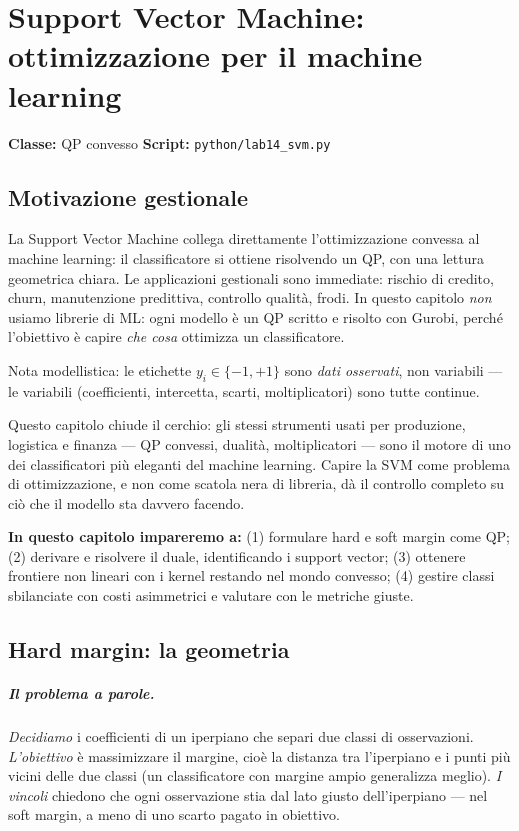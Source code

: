\chapter[Support Vector Machine]{Support Vector Machine: ottimizzazione per il machine learning}
\label{cap:svm}

\noindent\textbf{Classe:} QP convesso \hfill
\textbf{Script:} \texttt{python/lab14\_svm.py}

\section{Motivazione gestionale}

La Support Vector Machine collega direttamente l'ottimizzazione convessa al machine
learning: il classificatore si ottiene risolvendo un QP, con una lettura geometrica
chiara. Le applicazioni gestionali sono immediate: rischio di credito, churn,
manutenzione predittiva, controllo qualità, frodi. In questo capitolo \emph{non}
usiamo librerie di ML: ogni modello è un QP scritto e risolto con Gurobi, perché
l'obiettivo è capire \emph{che cosa} ottimizza un classificatore.

Nota modellistica: le etichette $y_i \in \{-1, +1\}$ sono \emph{dati osservati}, non
variabili --- le variabili (coefficienti, intercetta, scarti, moltiplicatori) sono
tutte continue.



Questo capitolo chiude il cerchio: gli stessi strumenti usati per produzione,
logistica e finanza --- QP convessi, dualità, moltiplicatori --- sono il motore di
uno dei classificatori più eleganti del machine learning. Capire la SVM come
problema di ottimizzazione, e non come scatola nera di libreria, dà il controllo
completo su ciò che il modello sta davvero facendo.

\textbf{In questo capitolo impareremo a:} (1) formulare hard e soft margin come QP;
(2) derivare e risolvere il duale, identificando i support vector; (3) ottenere
frontiere non lineari con i kernel restando nel mondo convesso; (4) gestire classi
sbilanciate con costi asimmetrici e valutare con le metriche giuste.

\section{Hard margin: la geometria}

\paragraph{Il problema a parole.} \emph{Decidiamo} i coefficienti di un iperpiano che
separi due classi di osservazioni. \emph{L'obiettivo} è massimizzare il margine, cioè
la distanza tra l'iperpiano e i punti più vicini delle due classi (un classificatore
con margine ampio generalizza meglio). \emph{I vincoli} chiedono che ogni osservazione
stia dal lato giusto dell'iperpiano --- nel soft margin, a meno di uno scarto pagato
in obiettivo.

